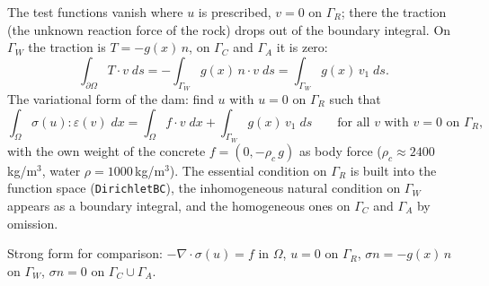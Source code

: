 \begin{center}
\end{center}

 The test functions vanish where $u$ is prescribed, $v = 0$ on $\Gamma_R$; there the traction (the unknown
reaction force of the rock) drops out of the boundary integral. On $\Gamma_W$ the traction is $T = -g(x)\, n$, on
$\Gamma_C$ and $\Gamma_A$ it is zero:
\[
  \int_{\partial\Omega} T \cdot v \; ds = -\int_{\Gamma_W} g(x)\, n \cdot v \; ds = \int_{\Gamma_W} g(x)\, v_1 \; ds .
\]
The variational form of the dam: find $u$ with $u = 0$ on $\Gamma_R$ such that
\[
  \int_\Omega \sigma(u) : \varepsilon(v) \; dx = \int_\Omega f \cdot v \; dx + \int_{\Gamma_W} g(x)\, v_1 \; ds
  \qquad \text{for all } v \text{ with } v = 0 \text{ on } \Gamma_R ,
\]
with the own weight of the concrete $f = (0, -\rho_c\, g)$ as body force ($\rho_c \approx 2400\,$kg/m$^3$, water
$\rho = 1000\,$kg/m$^3$). The essential condition on $\Gamma_R$ is built into the function space (\texttt{DirichletBC}),
the inhomogeneous natural condition on $\Gamma_W$ appears as a boundary integral, and the homogeneous ones on
$\Gamma_C$ and $\Gamma_A$ by omission.

Strong form for comparison: $-\nabla \cdot \sigma(u) = f$ in $\Omega$, $u = 0$ on $\Gamma_R$,
$\sigma n = -g(x)\, n$ on $\Gamma_W$, $\sigma n = 0$ on $\Gamma_C \cup \Gamma_A$.


